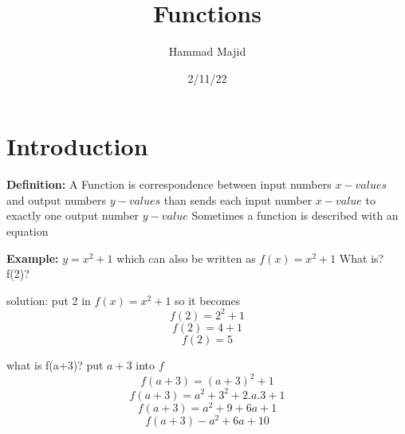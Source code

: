 \documentclass{article}
\title{Functions}
\author{Hammad Majid}
\date{2/11/22}
\begin{document}
\maketitle

\section*{Introduction}

\textbf{Definition:} A Function is correspondence between input  numbers $x-values$ and output numbers $y-values$ than sends each input number $x-value$ to exactly one output number $y-value$
\linebreak
Sometimes a function is described with an equation

\textbf{Example:} $y = x^2 + 1$ which can also be written as $f(x) = x^2 + 1$
\linebreak
What is? f(2)?

solution:
\linebreak
put 2 in $f(x) = x^2 + 1$
\linebreak
so it becomes 
$$f(2) = 2^2 + 1$$
$$f(2) = 4 + 1$$
$$f(2) = 5$$

what is f(a+3)?
\linebreak
put $a + 3$ into $f$
$$f(a + 3) = (a + 3)^2 + 1$$
$$f(a + 3) = a^2 + 3^2 + 2.a.3 + 1$$
$$f(a + 3) = a^2 + 9 + 6a + 1$$
$$f(a + 3) - a^2 + 6a + 10$$
\end{document}
